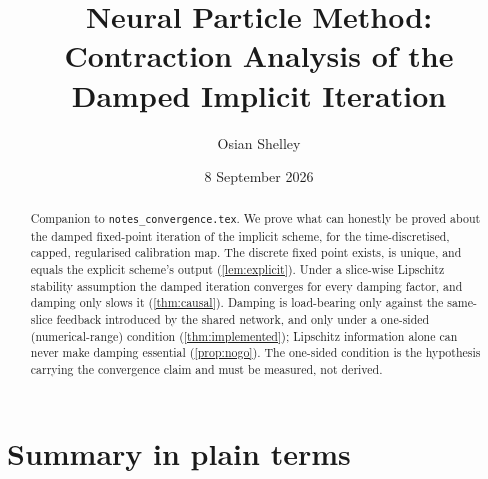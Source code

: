 \documentclass[11pt,a4paper]{article}
\title{Neural Particle Method: Contraction Analysis of the Damped Implicit Iteration}
\author{Osian Shelley}
\date{8 September 2026}
\theoremstyle{plain}
\theoremstyle{definition}
\theoremstyle{definition}
\begin{document}
\maketitle

\begin{abstract}
Companion to \texttt{notes\_convergence.tex}. We prove what can honestly be proved about the damped fixed-point iteration of the implicit scheme, for the time-discretised, capped, regularised calibration map. The discrete fixed point exists, is unique, and equals the explicit scheme's output (\cref{lem:explicit}). Under a slice-wise Lipschitz stability assumption the damped iteration converges for every damping factor, and damping only slows it (\cref{thm:causal}). Damping is load-bearing only against the same-slice feedback introduced by the shared network, and only under a one-sided (numerical-range) condition (\cref{thm:implemented}); Lipschitz information alone can never make damping essential (\cref{prop:nogo}). The one-sided condition is the hypothesis carrying the convergence claim and must be measured, not derived.
\end{abstract}

\section{Summary in plain terms}\label{sec:plain}
\end{document}
